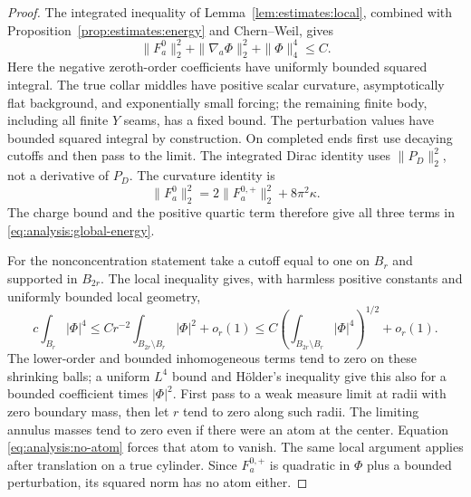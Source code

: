 \begin{proof}
The integrated inequality of Lemma~\ref{lem:estimates:local}, combined
with Proposition~\ref{prop:estimates:energy} and Chern--Weil, gives
\begin{equation}\label{eq:analysis:global-energy}
 \|F_a^0\|_2^2+\|\nabla_a\Phi\|_2^2+\|\Phi\|_4^4\leq C.
\end{equation}
Here the negative zeroth-order coefficients have uniformly bounded
squared integral.  The true collar middles have positive scalar
curvature, asymptotically flat background, and exponentially small
forcing; the remaining finite body, including all finite $Y$ seams,
has a fixed bound.  The perturbation values have bounded squared
integral by construction.  On completed ends first use decaying cutoffs
and then pass to the limit.  The integrated Dirac identity uses
$\|P_D\|_2^2$, not a derivative of $P_D$.  The curvature identity is
\[
 \|F_a^0\|_2^2=2\|F_a^{0,+}\|_2^2+8\pi^2\kappa.
\]
The charge bound and the positive quartic term therefore give all
three terms in \eqref{eq:analysis:global-energy}.

For the nonconcentration statement take a cutoff equal to one on $B_r$
and supported in $B_{2r}$.  The local inequality gives, with harmless
positive constants and uniformly bounded local geometry,
\begin{equation}\label{eq:analysis:no-atom}
 c\int_{B_r}|\Phi|^4
 \leq C r^{-2}\int_{B_{2r}\setminus B_r}|\Phi|^2+o_r(1)
 \leq C\left(\int_{B_{2r}\setminus B_r}|\Phi|^4\right)^{1/2}
          +o_r(1).
\end{equation}
The lower-order and bounded inhomogeneous terms tend to zero on these
shrinking balls; a uniform $L^4$ bound and H\"older's inequality give
this also for a bounded coefficient times $|\Phi|^2$.  First pass to
a weak measure limit at radii with zero boundary mass, then let $r$
tend to zero along such radii.  The limiting annulus masses tend to
zero even if there were an atom at the center.  Equation
\eqref{eq:analysis:no-atom} forces that atom to vanish.  The same local
argument applies after translation on a true cylinder.  Since
$F_a^{0,+}$ is quadratic in $\Phi$ plus a bounded perturbation,
its squared norm has no atom either.


\end{proof}

